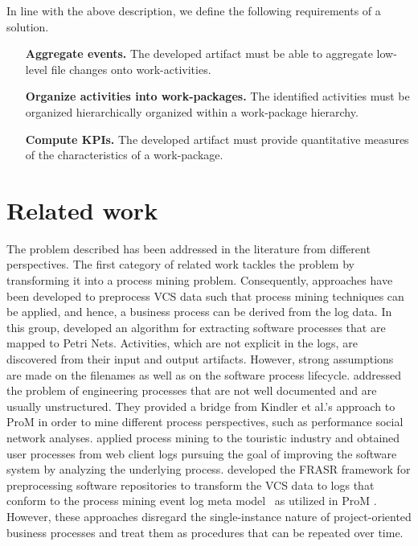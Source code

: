 In line with the above description, we define the following requirements of a solution. 
\begin{itemize}
	\item[\textbf{Aggregate events.}] The developed artifact must be able to aggregate low-level file changes onto work-activities. 
	\item[\textbf{Organize activities into work-packages.}] The identified activities must be organized hierarchically organized within a work-package hierarchy. 
	\item[\textbf{Compute KPIs.}] The developed artifact must provide quantitative measures of the characteristics of a work-package.
\end{itemize}

\section{Related work} 
\label{sec:bpm2015related}

The problem described has been addressed in the literature from different perspectives. The first category of related work tackles the problem by transforming it into a process mining problem. Consequently, approaches have been developed to preprocess VCS data such that process mining techniques can be applied, and hence, a business process can be derived from the log data.
In this group, \cite{DBLP:conf/se/KindlerRS06,kindler2006incremental} developed an algorithm for extracting software processes that are mapped to Petri Nets. Activities, which are not explicit in the logs, are discovered from their input and output artifacts. However, strong assumptions are made on the filenames as well as on the software process lifecycle. %
\cite{rubin2007process} addressed the problem of engineering processes that are not well documented and are usually unstructured. They provided a bridge from Kindler et al.'s approach to ProM \citep{van2005prom} in order to mine different process perspectives, such as performance social network analyses. %
\cite{rubin2014agile} applied process mining to the touristic industry and obtained user processes from web client logs pursuing the goal of improving the software system by analyzing the underlying process.
\cite{Poncin2011a} developed the FRASR framework for preprocessing software repositories to transform the VCS data to logs that conform to the process mining event log meta model~\citep{van2005meta} as utilized in ProM \citep{van2005prom}.
However, these approaches disregard the single-instance nature of project-oriented business processes and treat them as procedures that can be repeated over time.


